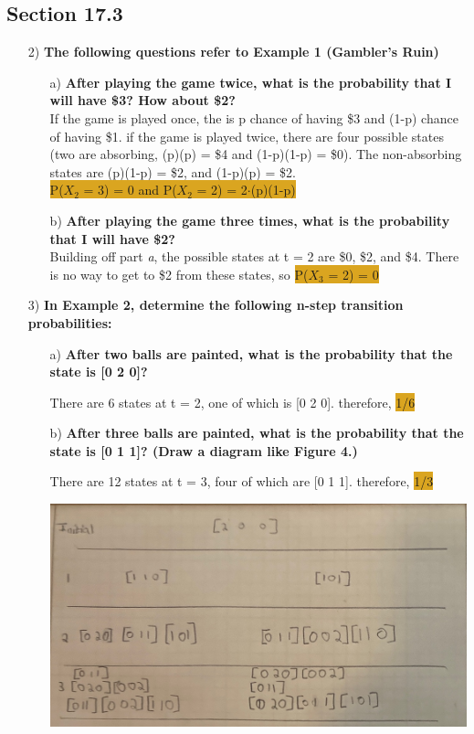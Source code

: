 \documentclass{article}
\begin{document}
\subsection*{Section 17.3}
\begin{enumerate}
\item[2) ]\textbf{The following questions refer to Example 1 (Gambler's Ruin)}
\begin{enumerate}
\item[a) ]\textbf{After playing the game twice, what is the probability that I will have \$3? How about \$2?}\\
	If the game is played once, the is p chance of having \$3 and (1-p) chance of having \$1. 
	if the game is played twice, there are four possible states (two are absorbing, (p)(p) = \$4 and (1-p)(1-p) = \$0). The non-absorbing states are (p)(1-p) = \$2, and (1-p)(p) = \$2.\\
\colorbox{Goldenrod}{P($X_2$ = 3) = 0 and P($X_2$ = 2) = 2$\cdot$(p)(1-p)}
	
\item[b) ]\textbf{After playing the game three times, what is the probability that I will have \$2?\\}
Building off part \emph{a}, the possible states at t = 2 are \$0, \$2, and \$4. There is no way to get to \$2 
from these states, so \colorbox{Goldenrod}{P($X_3$ = 2) = 0}
\end{enumerate}

\item[3) ] \textbf{In Example 2, determine the following n-step transition probabilities:}
\begin{enumerate}
\item[a) ]\textbf{After two balls are painted, what is the probability that the state is [0 2 0]?}

There are 6 states at t = 2, one of which is [0 2 0]. therefore, \colorbox{Goldenrod}{1/6}

\item[b) ]\textbf{After three balls are painted, what is the probability that the state is [0 1 1]? (Draw a diagram like Figure 4.)}

There are 12 states at t = 3, four of which are [0 1 1]. therefore, \colorbox{Goldenrod}{1/3}

\includegraphics[scale=.44]{17_3.JPG}

\end{enumerate}

\end{enumerate}
\end{document}
